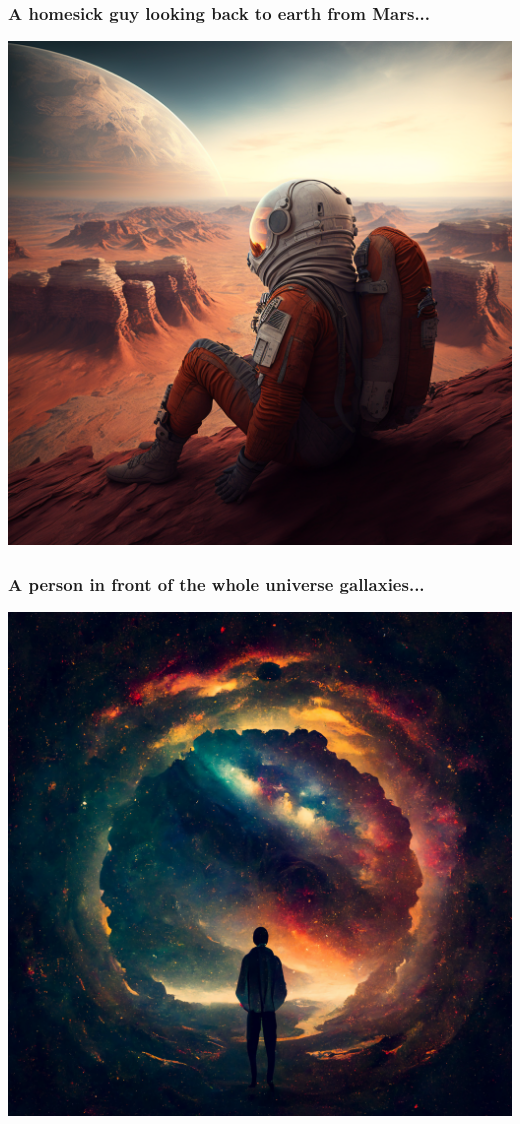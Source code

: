 \documentclass[9pt,table,xcolor=dvipsnames]{beamer}%
\theoremstyle{definition}
\theoremstyle{plain}
\begin{document}
\begin{frame}[fragile,t] %
  \frametitle{A homesick guy looking back to earth from Mars...}
  \begin{center}
    \includegraphics[scale=0.22]{./figs/chenle02_A_homesick_guy_looking_back_to_Earch_from_Mars_cinemar.png}
  \end{center}
\end{frame}
\begin{frame}[fragile,t] %
  \frametitle{A person in front of the whole universe gallaxies...}
  \begin{center}
    \includegraphics[scale=0.15]{./figs/chenle02_A_person_in_front_of_the_whole_universe_gallaxies.png}
  \end{center}
\end{frame}
\end{document}
